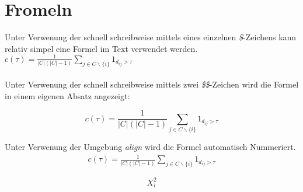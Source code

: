 \chapter{Fromeln}
Unter Verwenung der schnell schreibweise mittels eines einzelnen \emph{\$}-Zeichens kann relativ simpel eine Formel im Text verwendet werden.
$ c(\tau) =\frac{1}{|C|(|C|-1)} \sum_{j \in C\backslash \{i\}}1_{d_{ij}>\tau}$\\\\
Unter Verwenung der schnell schreibweise mittels zwei \emph{\$\$}-Zeichen wird die Formel in einem eigenen Absatz angezeigt:

$$ c(\tau) =\frac{1}{|C|(|C|-1)} \sum_{j \in C\backslash \{i\}}1_{d_{ij}>\tau}$$

Unter Verwenung der Umgebung \emph{align} wird die Formel automatisch Nummeriert.
\begin{align}
    c(\tau) =\frac{1}{|C|(|C|-1)} \sum_{j \in C\backslash \{i\}}1_{d_{ij}>\tau}
\end{align}

$$X_i^2$$